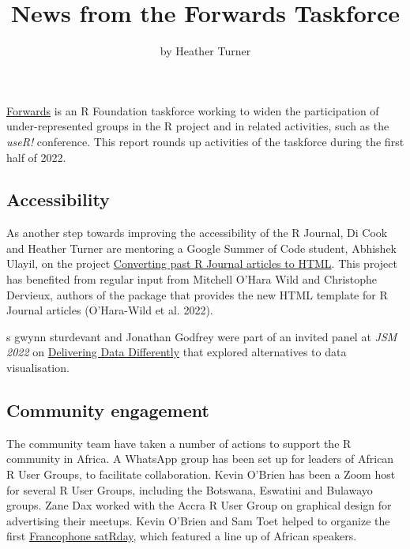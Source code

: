 \title{News from the Forwards Taskforce}
\author{by Heather Turner}

\maketitle


\href{https://forwards.github.io/}{Forwards} is an R Foundation taskforce working to widen the participation of under-represented groups in the R project and in related activities, such as the \emph{useR!} conference. This report rounds up activities of the taskforce during the first half of 2022.

\hypertarget{accessibility}{%
\subsection{Accessibility}\label{accessibility}}

As another step towards improving the accessibility of the R Journal, Di Cook and Heather Turner are mentoring a Google Summer of Code student, Abhishek Ulayil, on the project \href{https://github.com/rstats-gsoc/gsoc2022/wiki/Converting-past-R-Journal-articles-to-HTML}{Converting past R Journal articles to HTML}. This project has benefited from regular input from Mitchell O'Hara Wild and Christophe Dervieux, authors of the  package that provides the new HTML template for R Journal articles (O'Hara-Wild et al. 2022).

s gwynn sturdevant and Jonathan Godfrey were part of an invited panel at \emph{JSM 2022} on \href{https://ww2.amstat.org/meetings/jsm/2022/onlineprogram/AbstractDetails.cfm?abstractid=319247}{Delivering Data Differently} that explored alternatives to data visualisation.

\hypertarget{community-engagement}{%
\subsection{Community engagement}\label{community-engagement}}

The community team have taken a number of actions to support the R community in Africa. A WhatsApp group has been set up for leaders of African R User Groups, to facilitate collaboration. Kevin O'Brien has been a Zoom host for several R User Groups, including the Botswana, Eswatini and Bulawayo groups. Zane Dax worked with the Accra R User Group on graphical design for advertising their meetups. Kevin O'Brien and Sam Toet helped to organize the first \href{https://satrdays.org/blog/2022/07/20/2022-francophone/}{Francophone satRday}, which featured a line up of African speakers.

